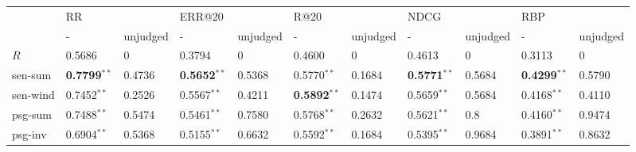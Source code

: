 \begin{tabular}{lllllllllll}
\toprule
{} & \multicolumn{2}{l}{RR} & \multicolumn{2}{l}{ERR@20} & \multicolumn{2}{l}{R@20} & \multicolumn{2}{l}{NDCG} & \multicolumn{2}{l}{RBP} \\
{} &                       - &                     unjudged &                       - &                     unjudged &                       - &                     unjudged &                       - &                    unjudged &                       - &                     unjudged \\
\midrule
$R$      &                  0.5686 &                       0 &                  0.3794 &                       0 &                  0.4600 &                       0 &                  0.4613 &                      0 &                  0.3113 &                       0 \\
sen-sum  &  \textbf{0.7799}$^{**}$ &          0.4736 &  \textbf{0.5652}$^{**}$ &           0.5368 &           0.5770$^{**}$ &          0.1684 &  \textbf{0.5771}$^{**}$ &          0.5684 &  \textbf{0.4299}$^{**}$ &           0.5790 \\
sen-wind &           0.7452$^{**}$ &          0.2526 &           0.5567$^{**}$ &          0.4211 &  \textbf{0.5892}$^{**}$ &          0.1474 &           0.5659$^{**}$ &          0.5684 &           0.4168$^{**}$ &           0.4110 \\
psg-sum  &           0.7488$^{**}$ &  0.5474 &           0.5461$^{**}$ &  0.7580 &           0.5768$^{**}$ &  0.2632 &           0.5621$^{**}$ &                         0.8 &           0.4160$^{**}$ &  0.9474 \\
psg-inv  &           0.6904$^{**}$ &           0.5368 &           0.5155$^{**}$ &           0.6632 &           0.5592$^{**}$ &          0.1684 &           0.5395$^{**}$ & 0.9684 &           0.3891$^{**}$ &           0.8632 \\
\bottomrule
\end{tabular}
